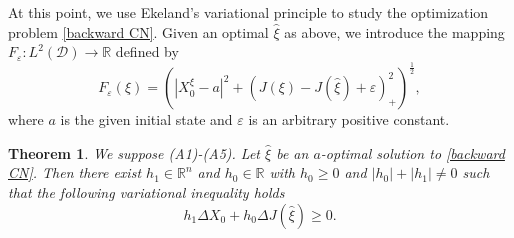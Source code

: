 \documentclass[11pt,a4paper]{article}
\newtheorem{theo}{Theorem}[section]
\begin{document}
At this point, we use Ekeland's variational principle \cite{Ekeland} to study the optimization problem \eqref{backward CN}.
Given an optimal $\hat \xi$ as above, we introduce the mapping $F_\varepsilon :L^2 (\mathcal D) \to \mathbb R$ defined by 
\begin{equation}\label{F-epsilon}
F_\varepsilon(\xi)=\left(|X_0^\xi-a|^2+(J(\xi)-J(\hat \xi)+\varepsilon)_+ ^2\right)^{\frac{1}{2}},
\end{equation}
where $a$ is the given initial state and $\varepsilon$ is an arbitrary positive constant.
\begin{theo}
    We suppose \emph{(A1)-(A5)}. Let $\hat \xi$ be an $a$-optimal solution to \eqref{backward CN}. Then there exist $h_1 \in \mathbb{R}^n$ and $h_0 \in \mathbb{R}$ with $h_0 \geq 0$ and $|h_0|+|h_1|\neq 0$  such that the following variational inequality holds
    \begin{equation}
    \label{variational inequality CN}
        h_1 \Delta{X}_0 +h_0 \Delta{J}(\hat \xi) \geq 0.
    \end{equation}
\end{theo} 
\end{document}
